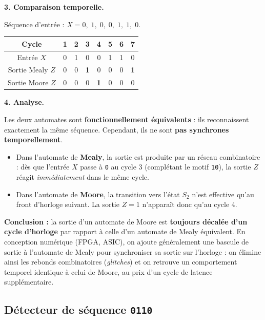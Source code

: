 \documentclass[a4paper,11pt]{article}
\begin{document}
\begin{solbox}
\medskip
\textbf{3. Comparaison temporelle.}

Séquence d'entrée : $X = 0,\; 1,\; 0,\; 0,\; 1,\; 1,\; 0$.

\medskip
\noindent
\begin{tabular}{|c|c|c|c|c|c|c|c|}
\hline
Cycle         & 1 & 2 & 3 & 4 & 5 & 6 & 7 \\
\hline
Entrée $X$    & 0 & 1 & 0 & 0 & 1 & 1 & 0 \\
\hline
Sortie Mealy $Z$  & 0 & 0 & \textbf{1} & 0 & 0 & 0 & \textbf{1} \\
\hline
Sortie Moore $Z$  & 0 & 0 & 0 & \textbf{1} & 0 & 0 & 0 \\
\hline
\end{tabular}

\medskip
\textbf{4. Analyse.}

Les deux automates sont \textbf{fonctionnellement équivalents} : ils reconnaissent exactement la même séquence. Cependant, ils ne sont \textbf{pas synchrones temporellement}.

\begin{itemize}
    \item Dans l'automate de \textbf{Mealy}, la sortie est produite par un réseau combinatoire : dès que l'entrée $X$ passe à \texttt{0} au cycle 3 (complétant le motif \texttt{10}), la sortie $Z$ réagit \emph{immédiatement} dans le même cycle.
    \item Dans l'automate de \textbf{Moore}, la transition vers l'état $S_2$ n'est effective qu'au front d'horloge suivant. La sortie $Z=1$ n'apparaît donc qu'au cycle 4.
\end{itemize}

\medskip
\noindent
\textbf{Conclusion :} la sortie d'un automate de Moore est \textbf{toujours décalée d'un cycle d'horloge} par rapport à celle d'un automate de Mealy équivalent. En conception numérique (FPGA, ASIC), on ajoute généralement une bascule de sortie à l'automate de Mealy pour synchroniser sa sortie sur l'horloge : on élimine ainsi les rebonds combinatoires (\emph{glitches}) et on retrouve un comportement temporel identique à celui de Moore, au prix d'un cycle de latence supplémentaire.

\end{solbox}
\fi

\subsection{Détecteur de séquence \texttt{0110}}
\end{document}
